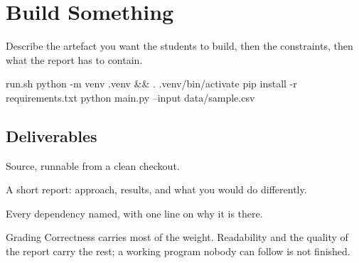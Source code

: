 \section{Build Something }

Describe the artefact you want the students to build, then the constraints,
then what the report has to contain.

\begin{codeblock}{run.sh}
python -m venv .venv && . .venv/bin/activate
pip install -r requirements.txt
python main.py --input data/sample.csv
\end{codeblock}

\subsection{Deliverables}

\begin{checklist}
    \item Source, runnable from a clean checkout.
    \item A short report: approach, results, and what you would do differently.
    \item Every dependency named, with one line on why it is there.
\end{checklist}

\begin{blockbox}{Grading}
    Correctness carries most of the weight. Readability and the quality of the
    report carry the rest; a working program nobody can follow is not finished.
\end{blockbox}
